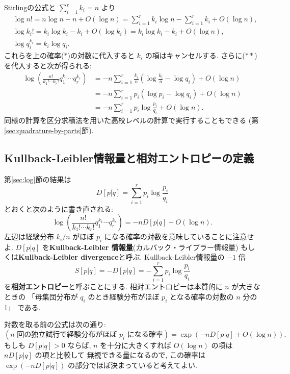 \documentclass[12pt,twoside]{jarticle}
\theoremstyle{definition} %
\theoremstyle{definition} %
\theoremstyle{definition} %
\numberwithin{theorem}{section}
\numberwithin{equation}{section}
\numberwithin{figure}{section}
\numberwithin{table}{section}
\newcommand\secref[1]{第\ref{#1}節}
\begin{document}
Stirlingの公式と $\sum_{i=1}^r k_i=n$ より
\begin{align*}
&
\log n! 
= n\log n - n + O(\log n)
= \sum_{i=1}^r k_i\log n - \sum_{i=1}^r k_i + O(\log n), 
\\ &
\log k_i! 
= k_i\log k_i - k_i + O(\log k_i) 
= k_i\log k_i - k_i + O(\log n),
\\ &
\log q_i^{k_i} = k_i\log q_i.
\end{align*}
これらを上の確率($*$)の対数に代入すると $k_i$ の項はキャンセルする.
さらに($**$)を代入すると次が得られる:
\begin{align*}
\log\left(\frac{n!}{k_1!\cdots k_r!} q_1^{k_1}\cdots q_r^{k_r}\right)
&
=
- n\sum_{i=1}^r \frac{k_i}{n}\left(\log\frac{k_i}{n}-\log q_i\right) 
+ O(\log n)
\\ &
= -n\sum_{i=1}^r p_i(\log p_i - \log q_i)+O(\log n)
\\ &
= -n\sum_{i=1}^r p_i\log\frac{p_i}{q_i}+O(\log n).
\end{align*}
同様の計算を区分求積法を用いた高校レベルの計算で実行することもできる
(\secref{sec:quadrature-by-parts}).



\subsection{Kullback-Leibler情報量と相対エントロピーの定義}

\secref{sec:log}の結果は
\[
D[p|q]=\sum_{i=1}^r p_i\log\frac{p_i}{q_i}
\]
とおくと次のように書き直される:
\[
\log\left(\frac{n!}{k_1!\cdots k_r!} q_1^{k_1}\cdots q_r^{k_r}\right)
=-n D[p|q] + O(\log n).
\]
左辺は経験分布 $k_i/n$ がほぼ $p_i$ になる確率の対数を意味していることに注意せよ.
$D[p|q]$ を{\bf Kullback-Leibler 情報量}(カルバック・ライブラー情報量)
もしくは{\bf Kullback-Leibler divergence}と呼ぶ.
Kullback-Leibler情報量の $-1$ 倍
\[
S[p|q] = -D[p|q] = - \sum_{i=1}^r p_i\log\frac{p_i}{q_i}
\]
を{\bf 相対エントロピー}と呼ぶことにする.
相対エントロピーは本質的に $n$ が大きなときの
「母集団分布が $q_i$ のとき経験分布がほぼ $p_i$ となる確率の対数の $n$ 分の1」
である.

対数を取る前の公式は次の通り:
\[
(\text{$n$ 回の独立試行で経験分布がほぼ $p_i$ になる確率})
=\exp(-n D[p|q] + O(\log n)).
\]
もしも $D[p|q]>0$ ならば,  
$n$ を十分に大きくすれば $O(\log n)$ の項は $n D[p|q]$ の項と比較して
無視できる量になるので, 
この確率は $\exp(-n D[p|q])$ の部分でほぼ決まっていると考えてよい. 

\end{document}
